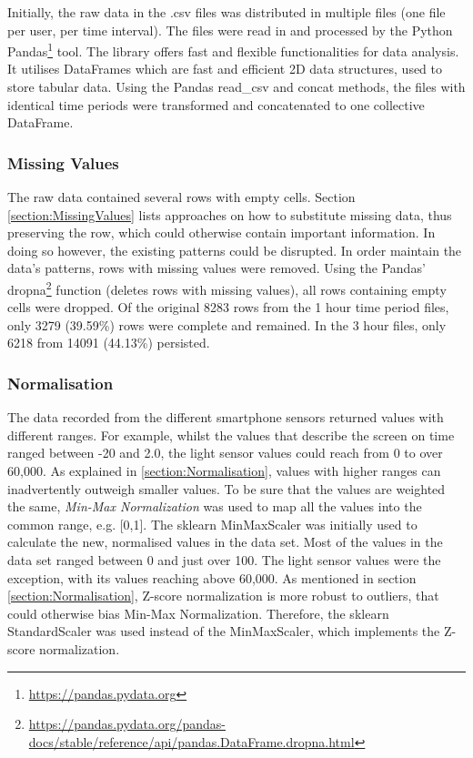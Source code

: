 Initially, the raw data in the .csv files was distributed in multiple files (one file per user, per time interval). The files were read in and processed by the Python Pandas\footnote{\url{https://pandas.pydata.org}} tool. The library offers fast and flexible functionalities for data analysis. It utilises DataFrames which are fast and efficient 2D data structures, used to store tabular data. Using the Pandas read\_csv and concat methods, the files with identical time periods were transformed and concatenated to one collective DataFrame. 


\subsubsection{Missing Values}
The raw data contained several rows with empty cells. Section \ref{section:MissingValues} lists approaches on how to substitute missing data, thus preserving the row, which could otherwise contain important information. In doing so however, the existing patterns could be disrupted. In order maintain the data's patterns, rows with missing values were removed. Using the Pandas' dropna\footnote{\url{https://pandas.pydata.org/pandas-docs/stable/reference/api/pandas.DataFrame.dropna.html}} function (deletes rows with missing values), all rows containing empty cells were dropped. Of the original 8283 rows from the 1 hour time period files, only 3279 (39.59\%) rows were complete and remained. In the 3 hour files, only 6218 from 14091 (44.13\%) persisted.

\subsubsection{Normalisation}
The data recorded from the different smartphone sensors returned values with different ranges. For example, whilst the values that describe the screen on time ranged between -20 and 2.0, the light sensor values could reach from 0 to over 60,000. As explained in \ref{section:Normalisation}, values with higher ranges can inadvertently outweigh smaller values. To be sure that the values are weighted the same, \textit{Min-Max Normalization} was used to map all the values into the common range, e.g. [0,1]. The sklearn MinMaxScaler was initially used to calculate the new, normalised values in the data set. Most of the values in the data set ranged between 0 and just over 100. The light sensor values were the exception, with its values reaching above 60,000. As mentioned in section \ref{section:Normalisation}, Z-score normalization is more robust to outliers, that could otherwise bias Min-Max Normalization. Therefore, the sklearn StandardScaler was used instead of the MinMaxScaler, which implements the Z-score normalization.

